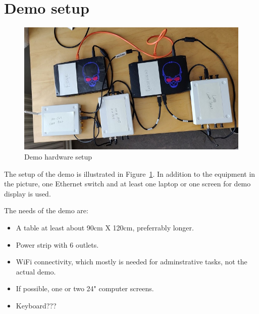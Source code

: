 \documentclass[10pt,emptycopyrightspace]{ewsn-proc}
\begin{document}
\clearpage
\section{Demo setup}

\begin{figure}[h]
  \centering
	\includegraphics[width= 0.42 \textwidth]{hardware.jpg}
	\caption{Demo hardware setup}
	\label{fig:hardware}
\end{figure}

The setup of the demo is illustrated in Figure~\ref{fig:hardware}.  In
addition to the equipment in the picture, one Ethernet switch and at
least one laptop or one screen for demo display is used.

The needs of the demo are:
\begin{itemize}
  \item A table at least about 90cm X 120cm, preferrably longer.
  \item Power strip with 6 outlets.
  \item WiFi connectivity, which mostly is needed for adminstrative
    tasks, not the actual demo.
  \item If possible, one or two 24" computer screens.
  \item Keyboard???
\end{itemize}
\end{document}
